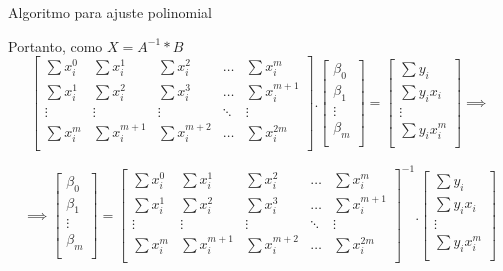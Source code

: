 \documentclass[10pt]{beamer}
\begin{document}
\begin{frame}[fragile]{Algoritmo para ajuste polinomial}
  
  Portanto, como $X = A^{-1} * B$
  \[
    \begin{bmatrix}
      \sum{x_{i}^{0}} & \sum{x_{i}^{1}} & \sum{x_{i}^{2}} & \dots  & \sum{x_{i}^{m}} \\
      \sum{x_{i}^{1}} & \sum{x_{i}^{2}} & \sum{x_{i}^{3}} & \dots & \sum{x_{i}^{m+1}}\\
      \vdots & \vdots & \vdots & \ddots & \vdots \\
      \sum{x_{i}^{m}} & \sum{x_{i}^{m+1}} & \sum{x_{i}^{m+2}} & \dots  & \sum{x_{i}^{2m}} \\
    \end{bmatrix}
    .
    \begin{bmatrix}
      \beta_0 \\
      \beta_1 \\
      \vdots  \\
      \beta_m \\
    \end{bmatrix}
    =
    \begin{bmatrix}
      \sum{y_{i}} \\
      \sum{y_{i}x_{i}}\\
      \vdots \\
      \sum{y_{i}x_{i}^{m}} \\
    \end{bmatrix}
    \implies
  \]

  \[
    \implies
    \begin{bmatrix}
      \beta_0 \\
      \beta_1 \\
      \vdots  \\
      \beta_m \\
    \end{bmatrix}
    =
    \begin{bmatrix}
      \sum{x_{i}^{0}} & \sum{x_{i}^{1}} & \sum{x_{i}^{2}} & \dots  & \sum{x_{i}^{m}} \\
      \sum{x_{i}^{1}} & \sum{x_{i}^{2}} & \sum{x_{i}^{3}} & \dots & \sum{x_{i}^{m+1}}\\
      \vdots & \vdots & \vdots & \ddots & \vdots \\
      \sum{x_{i}^{m}} & \sum{x_{i}^{m+1}} & \sum{x_{i}^{m+2}} & \dots  & \sum{x_{i}^{2m}} \\
    \end{bmatrix}^{-1}
    .
    \begin{bmatrix}
      \sum{y_{i}} \\
      \sum{y_{i}x_{i}}\\
      \vdots \\
      \sum{y_{i}x_{i}^{m}} \\
    \end{bmatrix}
  \]

\end{frame}
\end{document}
